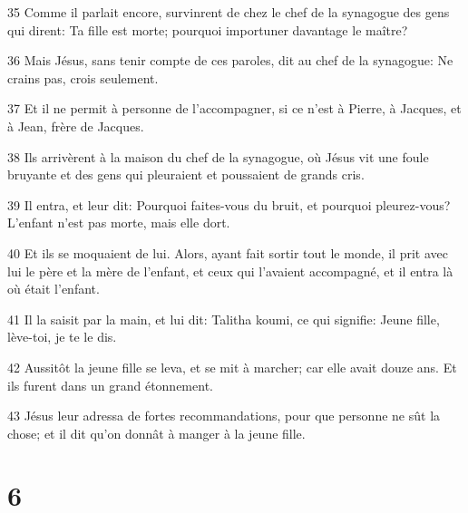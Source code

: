 \par 35 Comme il parlait encore, survinrent de chez le chef de la synagogue des gens qui dirent: Ta fille est morte; pourquoi importuner davantage le maître?
\par 36 Mais Jésus, sans tenir compte de ces paroles, dit au chef de la synagogue: Ne crains pas, crois seulement.
\par 37 Et il ne permit à personne de l'accompagner, si ce n'est à Pierre, à Jacques, et à Jean, frère de Jacques.
\par 38 Ils arrivèrent à la maison du chef de la synagogue, où Jésus vit une foule bruyante et des gens qui pleuraient et poussaient de grands cris.
\par 39 Il entra, et leur dit: Pourquoi faites-vous du bruit, et pourquoi pleurez-vous? L'enfant n'est pas morte, mais elle dort.
\par 40 Et ils se moquaient de lui. Alors, ayant fait sortir tout le monde, il prit avec lui le père et la mère de l'enfant, et ceux qui l'avaient accompagné, et il entra là où était l'enfant.
\par 41 Il la saisit par la main, et lui dit: Talitha koumi, ce qui signifie: Jeune fille, lève-toi, je te le dis.
\par 42 Aussitôt la jeune fille se leva, et se mit à marcher; car elle avait douze ans. Et ils furent dans un grand étonnement.
\par 43 Jésus leur adressa de fortes recommandations, pour que personne ne sût la chose; et il dit qu'on donnât à manger à la jeune fille.

\chapter{6}

